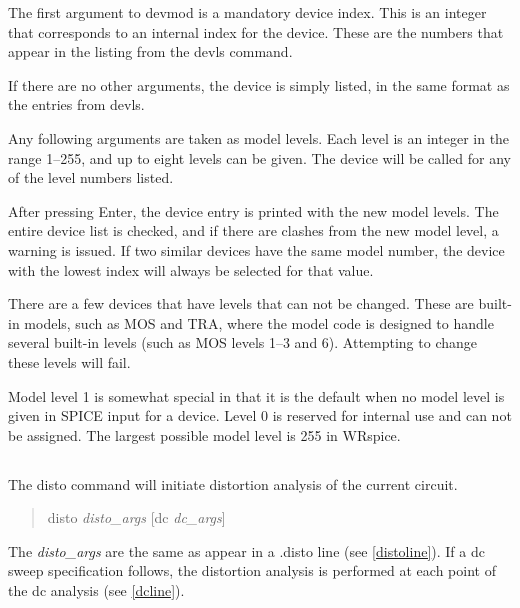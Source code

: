 The first argument to {\cb devmod} is a mandatory device index.  This
is an integer that corresponds to an internal index for the device. 
These are the numbers that appear in the listing from the {\cb devls}
command.

If there are no other arguments, the device is simply listed, in the
same format as the entries from {\cb devls}.

Any following arguments are taken as model levels.  Each level is an
integer in the range 1--255, and up to eight levels can be given.  The
device will be called for any of the level numbers listed.

After pressing {\kb Enter}, the device entry is printed with the new
model levels.  The entire device list is checked, and if there are
clashes from the new model level, a warning is issued.  If two similar
devices have the same model number, the device with the lowest index
will always be selected for that value.

There are a few devices that have levels that can not be changed. 
These are built-in models, such as MOS and TRA, where the model code
is designed to handle several built-in levels (such as MOS levels 1--3
and 6).  Attempting to change these levels will fail.

Model level 1 is somewhat special in that it is the default when no
model level is given in SPICE input for a device.  Level 0 is reserved
for internal use and can not be assigned.  The largest possible model
level is 255 in WRspice.

\subsection{}


The {\cb disto} command will initiate distortion analysis of the
current circuit.
\begin{quote}\vt
disto {\it disto\_args} [dc {\it dc\_args\/}]
\end{quote}
The {\it disto\_args} are the same as appear in a {\vt .disto} line
(see \ref{distoline}).  If a dc sweep specification follows, the
distortion analysis is performed at each point of the dc analysis
(see \ref{dcline}).

\subsection{}

